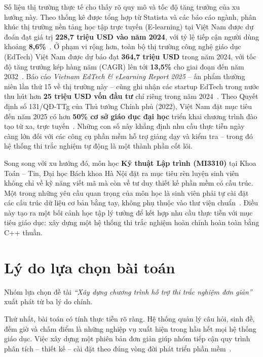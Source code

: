 \documentclass[11pt]{report}
\begin{document}
Số liệu thị trường thực tế cho thấy rõ quy mô và tốc độ tăng trưởng của xu hướng này. Theo thống kê được tổng hợp từ Statista và các báo cáo ngành, phân khúc thị trường nền tảng học tập trực tuyến (E-learning) tại Việt Nam được dự đoán đạt giá trị \textbf{228,7 triệu USD vào năm 2024}, với tỷ lệ tiếp cận người dùng khoảng \textbf{8,6\%}~\cite{statista2024vn}. Ở phạm vi rộng hơn, toàn bộ thị trường công nghệ giáo dục (EdTech) Việt Nam được dự báo đạt \textbf{364,7 triệu USD} trong năm 2024, với tốc độ tăng trưởng kép hàng năm (CAGR) lên tới \textbf{13,5\%} cho giai đoạn đến năm 2032~\cite{nettop2025}. Báo cáo \textit{Vietnam EdTech \& eLearning Report 2025} -- ấn phẩm thường niên lần thứ 15 về thị trường này -- cũng ghi nhận các startup EdTech trong nước thu hút hơn \textbf{25 triệu USD vốn đầu tư} chỉ riêng trong năm 2024~\cite{edtechreport2025}. Theo Quyết định số 131/QĐ-TTg của Thủ tướng Chính phủ (2022), Việt Nam đặt mục tiêu đến năm 2025 có hơn \textbf{50\% cơ sở giáo dục đại học} triển khai chương trình đào tạo từ xa, trực tuyến~\cite{qd131}. Những con số này khẳng định nhu cầu thực tiễn ngày càng lớn đối với các công cụ phần mềm hỗ trợ giảng dạy và kiểm tra -- trong đó hệ thống thi trắc nghiệm tự động là một thành phần cốt lõi.

Song song với xu hướng đó, môn học \textbf{Kỹ thuật Lập trình (MI3310)} tại Khoa Toán -- Tin, Đại học Bách khoa Hà Nội đặt ra mục tiêu rèn luyện sinh viên không chỉ về kỹ năng viết mã mà còn về tư duy thiết kế phần mềm có cấu trúc. Một trong những yêu cầu quan trọng của môn học là sinh viên phải tự cài đặt các cấu trúc dữ liệu cơ bản bằng tay, không phụ thuộc vào thư viện chuẩn~\cite{nam2022}. Điều này tạo ra một bối cảnh học tập lý tưởng để kết hợp nhu cầu thực tiễn với mục tiêu giáo dục: xây dựng một hệ thống thi trắc nghiệm hoàn chỉnh hoàn toàn bằng C++ thuần.

\section{Lý do lựa chọn bài toán}

Nhóm lựa chọn đề tài \textit{``Xây dựng chương trình hỗ trợ thi trắc nghiệm đơn giản''} xuất phát từ ba lý do chính.

Thứ nhất, bài toán có tính thực tiễn rõ ràng. Hệ thống quản lý câu hỏi, sinh đề, đếm giờ và chấm điểm là những nghiệp vụ xuất hiện trong hầu hết mọi hệ thống giáo dục. Việc xây dựng một phiên bản đơn giản giúp nhóm tiếp cận quy trình phân tích -- thiết kế -- cài đặt theo đúng vòng đời phát triển phần mềm~\cite{sommerville2016}.
\end{document}
